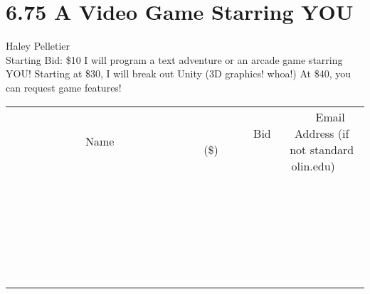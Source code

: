 \documentclass[11pt]{article}
\begin{document}
\section*{6.75 A Video Game Starring YOU}
Haley Pelletier
\\
Starting Bid: \$10
\newline
I will program a text adventure or an arcade game starring YOU!  Starting at \$30, I will break out Unity (3D graphics! whoa!)  At \$40, you can request game features!
\\[6ex]
\begin{tabular}{c c c}
~~~~~~~~~~~~~Name~~~~~~~~~~~~~ & ~~~~~~~~~Bid (\$)~~~~~~~~~  & ~~~Email Address (if not standard olin.edu)~~~\\
 & & \\
\hline
 & & \\
\hline
 & & \\
\hline
 & & \\
\hline
 & & \\
\hline
 & & \\
\hline
 & & \\
\hline
 & & \\
\hline
 & & \\
\hline
 & & \\
\hline
 & & \\
\hline
 & & \\
\hline
 & & \\
\hline
 & & \\
\hline
 & & \\
\hline
 & & \\
\hline
 & & \\
\hline
 & & \\
\hline
 & & \\
\hline
 & & \\
\hline
 & & \\
\hline
 & & \\
\hline
 & & \\
\hline
 & & \\
\hline
 & & \\
\hline
 & & \\
\hline
\end{tabular}
\newpage
\end{document}
